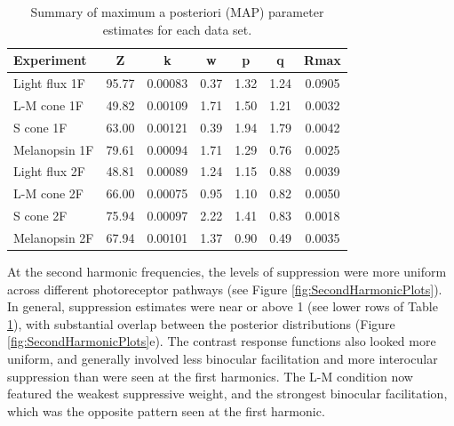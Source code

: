 \documentclass[
]{article}
\begin{document}
\begin{table}[H]

\caption{\label{tab:paramtable}Summary of maximum a posteriori (MAP) parameter estimates for each data set.}
\centering
\begin{tabular}[t]{lcccccc}
\toprule
Experiment & Z & k & w & p & q & Rmax\\
\midrule
Light flux 1F & 95.77 & 0.00083 & 0.37 & 1.32 & 1.24 & 0.0905\\
L-M cone 1F & 49.82 & 0.00109 & 1.71 & 1.50 & 1.21 & 0.0032\\
S cone 1F & 63.00 & 0.00121 & 0.39 & 1.94 & 1.79 & 0.0042\\
Melanopsin 1F & 79.61 & 0.00094 & 1.71 & 1.29 & 0.76 & 0.0025\\
\midrule
Light flux 2F & 48.81 & 0.00089 & 1.24 & 1.15 & 0.88 & 0.0039\\
L-M cone 2F & 66.00 & 0.00075 & 0.95 & 1.10 & 0.82 & 0.0050\\
S cone 2F & 75.94 & 0.00097 & 2.22 & 1.41 & 0.83 & 0.0018\\
Melanopsin 2F & 67.94 & 0.00101 & 1.37 & 0.90 & 0.49 & 0.0035\\
\bottomrule
\end{tabular}
\end{table}

At the second harmonic frequencies, the levels of suppression were more uniform across different photoreceptor pathways (see Figure \ref{fig:SecondHarmonicPlots}). In general, suppression estimates were near or above 1 (see lower rows of Table \ref{tab:paramtable}), with substantial overlap between the posterior distributions (Figure \ref{fig:SecondHarmonicPlots}e). The contrast response functions also looked more uniform, and generally involved less binocular facilitation and more interocular suppression than were seen at the first harmonics. The L-M condition now featured the weakest suppressive weight, and the strongest binocular facilitation, which was the opposite pattern seen at the first harmonic.
\end{document}
